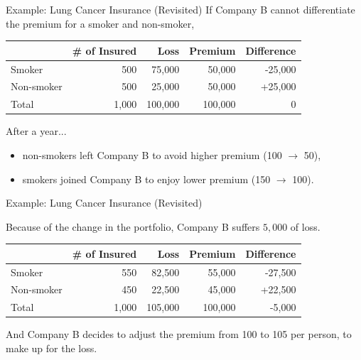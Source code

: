\documentclass[ignorenonframetext,]{beamer}
\begin{document}
\begin{frame}{Example: Lung Cancer Insurance (Revisited)}
If Company B cannot differentiate the premium for a smoker and non-smoker,
\begin{table}[]
\begin{tabular}{l|rrrr}
\hline\hline
           & \# of Insured & Loss    & Premium & Difference \\ \hline
Smoker     & 500           & 75,000  & 50,000  & -25,000          \\
Non-smoker & 500           & 25,000  & 50,000  & +25,000          \\ \hline
Total      & 1,000         & 100,000 & 100,000 & 0       \\  \hline\hline
\end{tabular}
\end{table}
 After a year...
\begin{itemize}
	 \item {} non-smokers left Company B to avoid higher premium (100 $\rightarrow$ 50),
 	 \item {} smokers joined Company B to enjoy lower premium (150 $\rightarrow$ 100).
\end{itemize}

\end{frame}


\begin{frame}{Example: Lung Cancer Insurance (Revisited)}

Because of the change in the portfolio, Company B suffers $5,000$ of loss.
\begin{table}[]
\begin{tabular}{l|rrrr}
\hline\hline
           & \# of Insured & Loss    & Premium & Difference \\ \hline
Smoker     & 550           & 82,500  & 55,000  & -27,500          \\
Non-smoker & 450           & 22,500  & 45,000  & +22,500          \\ \hline
Total      & 1,000         & 105,000 & 100,000 & -5,000       \\  \hline\hline
\end{tabular}
\end{table}
 And Company B decides to adjust the premium from 100 to 105 per person, to make up for the loss.
\end{frame}
\end{document}
